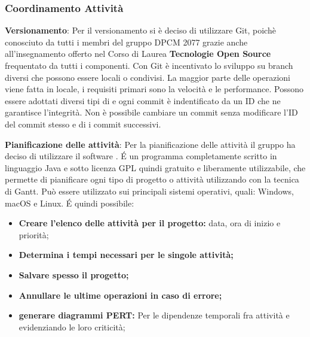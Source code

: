 \subsubsection{Coordinamento Attività}
\begin{description}
\item{\textbf{Versionamento}}: Per il versionamento si è deciso di utilizzare Git, poichè conosciuto da tutti i membri del gruppo DPCM 2077 grazie anche all'insegnamento offerto
nel Corso di Laurea \textbf{Tecnologie Open Source} frequentato da tutti i componenti. Con Git è incentivato lo sviluppo su branch diversi che possono essere locali o condivisi.
La maggior parte delle operazioni viene fatta in locale, i requisiti primari sono la velocità e le performance.
Possono essere adottati diversi tipi di  e ogni commit è indentificato da un ID che ne garantisce l'integrità.
Non è possibile cambiare un commit senza modificare l’ID del commit stesso e di i commit successivi.  

\item{\textbf{Pianificazione delle attività}}:  Per la pianificazione delle attività il gruppo ha deciso di utilizzare il software \textbf{}. 
\'E un programma completamente scritto in linguaggio Java e sotto licenza GPL quindi gratuito e liberamente utilizzabile, che permette di pianificare ogni tipo di progetto o attività utilizzando con la tecnica di Gantt.
Può essere utilizzato sui principali sistemi operativi, quali: Windows, macOS e Linux.
\'E quindi possibile:
\begin{itemize}
\item{\textbf{Creare l'elenco delle attività per il progetto:} data, ora di inizio e priorità;}
\item{\textbf{Determina i tempi necessari per le singole attività;}}
\item{\textbf{Salvare spesso il progetto;}}
\item{\textbf{Annullare le ultime operazioni in caso di errore;}}
\item{\textbf{generare diagrammi PERT:} Per le dipendenze temporali fra attività e evidenziando le loro criticità;}
\end{itemize} 
\end{description}

